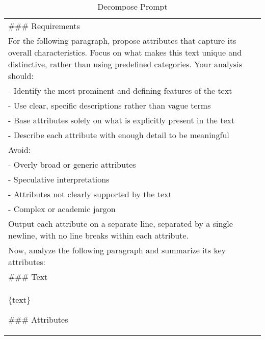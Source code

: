 \begin{table}[htbp]
    \vspace{-0.5em}
    \centering
    \small
    \begin{tabular}{p{7cm}}
     \toprule
\#\#\# Requirements \\
For the following paragraph, propose attributes that capture its overall characteristics. Focus on what makes this text unique and distinctive, rather than using predefined categories. Your analysis should: \\
- Identify the most prominent and defining features of the text \\ 
- Use clear, specific descriptions rather than vague terms \\
- Base attributes solely on what is explicitly present in the text \\
- Describe each attribute with enough detail to be meaningful \\
Avoid: \\
- Overly broad or generic attributes \\
- Speculative interpretations \\ 
- Attributes not clearly supported by the text \\ 
- Complex or academic jargon \\

Output each attribute on a separate line, separated by a single newline, with no line breaks within each attribute. \\

Now, analyze the following paragraph and summarize its key attributes: \\

\#\#\# Text \\
\{text\}

\#\#\# Attributes  \\
\bottomrule
    \end{tabular}
    \caption{Decompose Prompt}
    \label{tab:decompose_prompt}
\end{table}